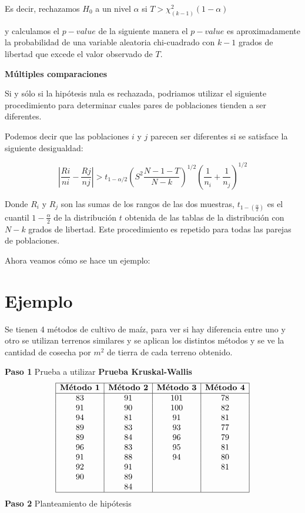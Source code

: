 \documentclass[
  a4paper,
  oneside,
  openany]{book}
\begin{document}
Es decir, rechazamos \(H_0\) a un nivel \(\alpha\) si \(T > \chi^2_{(k-1)}(1-\alpha)\)

y calculamos el \(p-value\) de la siguiente manera el \(p-value\) es aproximadamente la probabilidad de una variable aleatoria chi-cuadrado con \(k-1\) grados de libertad que excede el valor observado de \(T\).

\textbf{Múltiples comparaciones}

Si y sólo si la hipótesis nula es rechazada, podriamos utilizar el siguiente procedimiento para determinar cuales pares de poblaciones tienden a ser diferentes.

Podemos decir que las poblaciones \(i\) y \(j\) parecen ser diferentes si se satisface la siguiente desigualdad:

\[\left|\frac{Ri}{ni}- \frac{Rj}{nj}\right|> t_{1-\alpha/2}\left(S^2\frac{N-1-T}{N-k}\right)^{1/2}\left(\frac{1}{n_i}+\frac{1}{n_j}\right)^{1/2}\]

Donde \(R_i\) y \(R_j\) son las sumas de los rangos de las dos muestras, \(t_{1-(\frac{\alpha}{2})}\) es el cuantil \(1-\frac{\alpha}{2}\) de la distribución \(t\) obtenida de las tablas de la distribución con \(N-k\) grados de libertad. Este procedimiento es repetido para todas las parejas de poblaciones.

Ahora veamos cómo se hace un ejemplo:

\hypertarget{ejemplo-7}{%
\section{Ejemplo}\label{ejemplo-7}}

Se tienen 4 métodos de cultivo de maíz, para ver si hay diferencia entre uno y otro se utilizan terrenos similares y se aplican los distintos métodos y se ve la cantidad de cosecha por \(m^2\) de tierra de cada terreno obtenido.

\textbf{Paso 1} Prueba a utilizar \textbf{Prueba Kruskal-Wallis}
\[
\begin{array}{|c| c| c| c|} 
\hline
\textbf{Método 1} & \textbf{Método 2} & \textbf{Método 3} & \textbf{Método 4}\\
\hline
83&91&101&78\\
91&90&100&82\\
94&81&91&81\\
89&83&93&77\\
89&84&96&79\\
96&83&95&81\\
91&88&94&80\\
92&91&  &81\\
90&89&  &\\
  &84&  &\\
  \hline
\end{array}
\]
\textbf{Paso 2} Planteamiento de hipótesis
\end{document}
